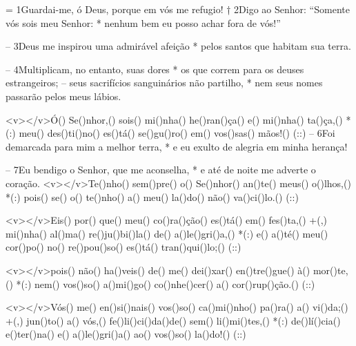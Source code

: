 = 1Guardai-me, ó Deus, porque em vós me refugio! †
2Digo ao Senhor: “Somente vós sois meu Senhor: *
nenhum bem eu posso achar fora de vós!”

– 3Deus me inspirou uma admirável afeição *
pelos santos que habitam sua terra.

– 4Multiplicam, no entanto, suas dores *
os que correm para os deuses estrangeiros;
– seus sacrifícios sanguinários não partilho, *
nem seus nomes passarão pelos meus lábios.

<v></v>Ó() Se()nhor,() sois() mi()nha() he()ran()ça() e() mi()nha() ta()ça,() *(:)
meu() des()ti()no() es()tá() se()gu()ro() em() vos()sas() mãos!() (::)
– 6Foi demarcada para mim a melhor terra, *
e eu exulto de alegria em minha herança!

– 7Eu bendigo o Senhor, que me aconselha, *
e até de noite me adverte o coração.
<v></v>Te()nho() sem()pre() o() Se()nhor() an()te() meus() o()lhos,() *(:)
pois() se() o() te()nho() a() meu() la()do() não() va()ci()lo.() (::)

<v></v>Eis() por() que() meu() co()ra()ção() es()tá() em() fes()ta,() +(,)
mi()nha() al()ma() re()ju()bi()la() de() a()le()gri()a,() *(:)
e() a()té() meu() cor()po() no() re()pou()so() es()tá() tran()qui()lo;() (::)

<v></v>pois() não() ha()veis() de() me() dei()xar() en()tre()gue() à() mor()te,() *(:)
nem() vos()so() a()mi()go() co()nhe()cer() a() cor()rup()ção.() (::)

<v></v>Vós() me() en()si()nais() vos()so() ca()mi()nho() pa()ra() a() vi()da;() +(,)
jun()to() a() vós,() fe()li()ci()da()de() sem() li()mi()tes,() *(:)
de()lí()cia() e()ter()na() e() a()le()gri()a() ao() vos()so() la()do!() (::)